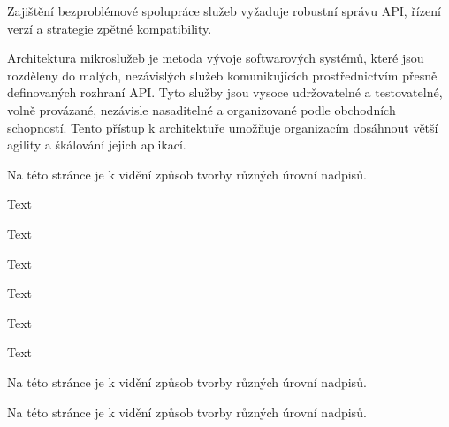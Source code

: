  Zajištění bezproblémové spolupráce služeb vyžaduje robustní správu API, řízení verzí a strategie zpětné kompatibility.


Architektura mikroslužeb je metoda vývoje softwarových systémů, které jsou rozděleny do malých, nezávislých služeb komunikujících prostřednictvím přesně definovaných rozhraní API. Tyto služby jsou vysoce udržovatelné a testovatelné, volně provázané, nezávisle nasaditelné a organizované podle obchodních schopností. Tento přístup k architektuře umožňuje organizacím dosáhnout větší agility a škálování jejich aplikací.

Na této stránce je k vidění způsob tvorby různých úrovní nadpisů.

Text

Text

Text

Text

Text

Text




Na této stránce je k vidění způsob tvorby různých úrovní nadpisů.





Na této stránce je k vidění způsob tvorby různých úrovní nadpisů.








